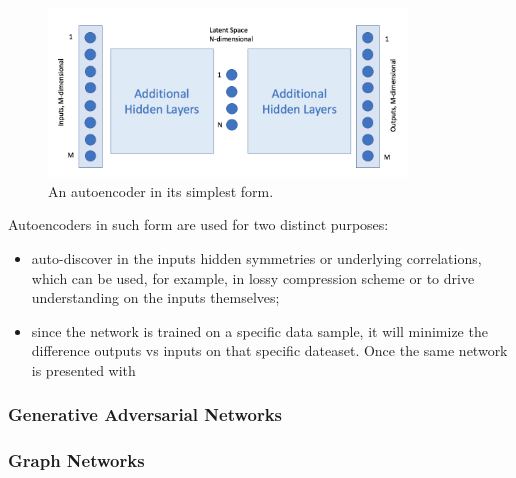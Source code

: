 \begin{figure}[h]
     \centering
     \includegraphics[width=0.85\textwidth]{images/autoencoder.png}
     \caption{An autoencoder in its simplest form.}
     \label{fig:autoencoder}
 \end{figure}
 
 Autoencoders in such form are used for two distinct purposes:
 \begin{itemize}
     \item auto-discover in the inputs hidden symmetries or underlying correlations, which can be used, for example, in lossy compression scheme or to drive understanding on the inputs themselves;
     \item since the network is trained on a specific data sample, it will minimize the difference outputs vs inputs on that specific dateaset. Once the same network is presented with 
 \end{itemize}
 

\subsubsection{Generative Adversarial Networks}
\subsubsection{Graph Networks}




